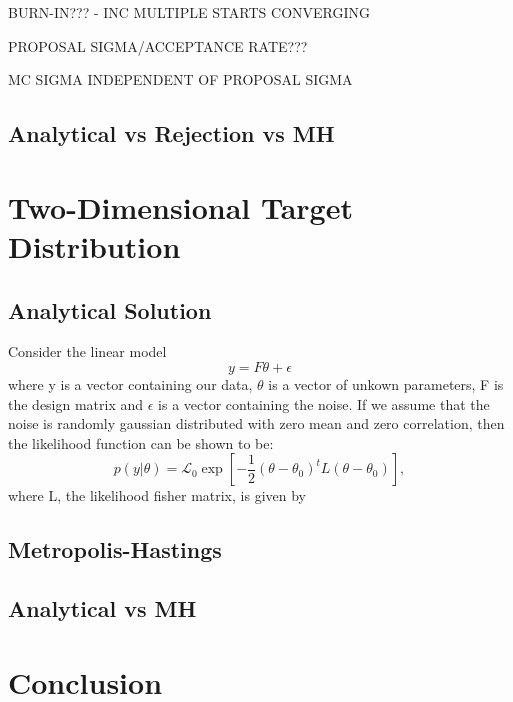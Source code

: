 \documentclass[a4paper,11pt,twoside]{article}
\begin{document}
BURN-IN??? - INC MULTIPLE STARTS CONVERGING

PROPOSAL SIGMA/ACCEPTANCE RATE???

MC SIGMA INDEPENDENT OF PROPOSAL SIGMA
\subsection{Analytical vs Rejection vs MH}

\section{Two-Dimensional Target Distribution} 
\subsection{Analytical Solution}
Consider the linear model
\begin{equation}
	y = F\theta + \epsilon
\end{equation}
where y is a vector containing our data, $\theta$ is a vector of unkown parameters, F is the design matrix and $\epsilon$ is a vector containing the noise. If we assume that the noise is randomly gaussian distributed with zero mean and zero correlation, then the likelihood function can be shown to be:
\begin{equation}
	p(y|\theta) = \mathcal{L}_0 \exp\left[-\frac{1}{2}(\theta - \theta_0)^tL(\theta - \theta_0)\right],
\end{equation}
where L, the likelihood fisher matrix, is given by

\subsection{Metropolis-Hastings} 
\subsection{Analytical vs MH}

\section{Conclusion}

\appendix 
\label{appendix}
\end{document}

